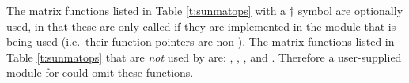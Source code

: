The matrix functions listed in Table \ref{t:sunmatops} with
a $\dagger$ symbol are optionally used, in that these are only called
if they are implemented in the {\sunmatrix} module that is being used
(i.e.~their function pointers are non-).  The matrix
functions listed in Table \ref{t:sunmatops} that are {\em not} used by 
{\ida} are: , , ,
 and . Therefore a user-supplied
{\sunmatrix} module for {\ida} could omit these functions.






